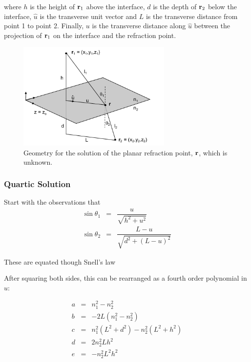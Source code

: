 \noindent \noindent where $h$ is the height of $\mathbf{r}_1$ above the interface, $d$ is the depth of $\mathbf{r}_2$ below the interface, $\hat{u}$ is the transverse unit vector and $L$ is the transverse distance from point 1 to point 2. Finally, $u$ is the transverse distance along $\hat{u}$ between the projection of $\mathbf{r}_1$ on the interface and the refraction point.
 
\begin{figure}[h] 
   \centering
   \includegraphics[width=3in]{ReflectionRefraction/Figures/refractionPlane} 
   \caption{Geometry for the solution of the planar refraction point, $\mathbf{r}$, which is unknown.}
   \label{fig9a}
\end{figure}

\subsubsection{Quartic Solution}
 
Start with the observations that 
\begin{eqnarray} 
\sin\theta_1 &=& \dfrac{u}{\sqrt{h^2 + u^2}} \nonumber \\
\sin\theta_2 &=& \dfrac{L-u}{\sqrt{d^2 + (L-u)^2}} \nonumber
\end{eqnarray}

These are equated though Snell's law

After squaring both sides, this can be rearranged as a fourth order polynomial in $u$:

\begin{eqnarray} 
a &=& n_1^2 - n_2^2 \nonumber \\
b &=& -2 L (n_1^2 - n_2^2) \nonumber \\
c &=& n_1^2(L^2  + d^2) - n_2^2( L^2 + h^2) \nonumber \\
d &=& 2 n_2^2 L h^2 \nonumber \\
e &=& -n_2^2 L^2 h^2  \nonumber
\end{eqnarray}

